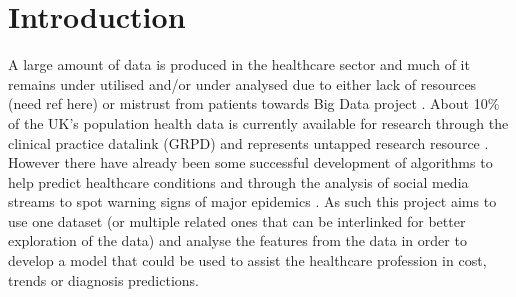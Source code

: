 \chapter{Introduction}
 \setcounter{page}{1}

A large amount of data is produced in the healthcare sector \cite{EMC:2014ve} and much of it remains under utilised and/or under analysed due to either lack of resources (need ref here) or mistrust from patients towards Big Data project \cite{Goldacre:tf}\cite{bcs:2017tl}. About 10\% of the UK’s population health data is currently available for research through the clinical practice datalink (GRPD) and represents untapped research resource \cite{Kousoulis:2015ti}. However there have already been some successful development of algorithms to help predict healthcare conditions \cite{Bellon:2013um} and through the analysis of social media streams to spot warning signs of major epidemics \cite{Kostkova:2016ur}.
As such this project aims to use one dataset (or multiple related ones that can be interlinked for better exploration of the data) and analyse the features from the data in order to develop a model that could be used to assist the healthcare profession in cost, trends or diagnosis predictions.


